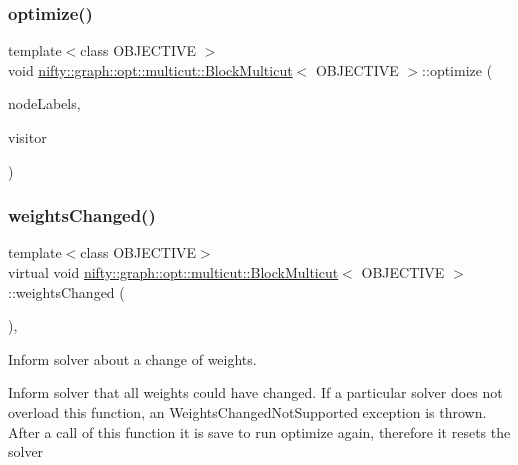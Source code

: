 \subsubsection{\texorpdfstring{optimize()}{optimize()}}
{\footnotesize\ttfamily template$<$class O\+B\+J\+E\+C\+T\+I\+VE $>$ \\
void \hyperlink{classnifty_1_1graph_1_1opt_1_1multicut_1_1BlockMulticut}{nifty\+::graph\+::opt\+::multicut\+::\+Block\+Multicut}$<$ O\+B\+J\+E\+C\+T\+I\+VE $>$\+::optimize (\begin{DoxyParamCaption}\item[{Node\+Labels \&}]{node\+Labels,  }\item[{\hyperlink{classnifty_1_1graph_1_1opt_1_1multicut_1_1BlockMulticut_aa40e397b4bec33962317d71164d34c49}{Visitor\+Base\+Type} $\ast$}]{visitor }\end{DoxyParamCaption})\hspace{0.3cm}{\ttfamily [virtual]}}

\mbox{\label{classnifty_1_1graph_1_1opt_1_1multicut_1_1BlockMulticut_a7646a6b7c8fe3b8e40ab6f72ab952081}} 
\subsubsection{\texorpdfstring{weights\+Changed()}{weightsChanged()}}
{\footnotesize\ttfamily template$<$class O\+B\+J\+E\+C\+T\+I\+VE$>$ \\
virtual void \hyperlink{classnifty_1_1graph_1_1opt_1_1multicut_1_1BlockMulticut}{nifty\+::graph\+::opt\+::multicut\+::\+Block\+Multicut}$<$ O\+B\+J\+E\+C\+T\+I\+VE $>$\+::weights\+Changed (\begin{DoxyParamCaption}{ }\end{DoxyParamCaption})\hspace{0.3cm}{\ttfamily [inline]}, {\ttfamily [virtual]}}



Inform solver about a change of weights. 

Inform solver that all weights could have changed. If a particular solver does not overload this function, an Weights\+Changed\+Not\+Supported exception is thrown. After a call of this function it is save to run optimize again, therefore it resets the solver 

